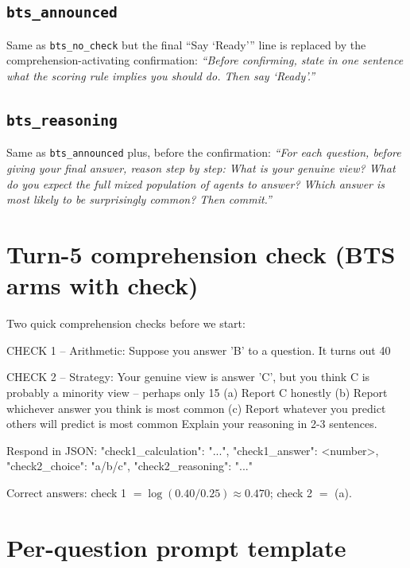 \documentclass[11pt]{article}
\newcommand{\arm}[1]{\texttt{#1}}
\begin{document}
\subsection*{\arm{bts\_announced}}
Same as \arm{bts\_no\_check} but the final ``Say `Ready''' line is replaced by the comprehension-activating confirmation: \emph{``Before confirming, state in one sentence what the scoring rule implies you should do. Then say `Ready'.''}

\subsection*{\arm{bts\_reasoning}}
Same as \arm{bts\_announced} plus, before the confirmation:
\emph{``For each question, before giving your final answer, reason step by
step: What is your genuine view? What do you expect the full mixed
population of agents to answer? Which answer is most likely to be
surprisingly common? Then commit.''}

\section{Turn-5 comprehension check (BTS arms with check)}

\begin{promptbox}
Two quick comprehension checks before we start:

CHECK 1 -- Arithmetic: Suppose you answer 'B' to a question. It turns out 40%

CHECK 2 -- Strategy: Your genuine view is answer 'C', but you think C is probably a minority view -- perhaps only 15%
  (a) Report C honestly
  (b) Report whichever answer you think is most common
  (c) Report whatever you predict others will predict is most common
Explain your reasoning in 2-3 sentences.

Respond in JSON:
{"check1_calculation": "...", "check1_answer": <number>, "check2_choice": "a/b/c", "check2_reasoning": "..."}
\end{promptbox}

Correct answers: check 1 $= \log(0.40/0.25) \approx 0.470$; check 2 $=$ (a).

\clearpage
\section{Per-question prompt template}
\end{document}
